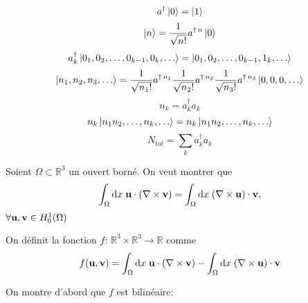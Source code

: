 \documentclass[letterpaper,12pt,oneside,final]{book}
\begin{document}
\[ a^{\dagger} \ket{0} = \ket{1}\]
\[ \ket{n} = \frac{1}{\sqrt{n!}} a^{\dagger\,n} \ket{0} \]
\[ a^{\dagger}_{k} \ket{0_{1},0_{2},\ldots,0_{k-1},0_{k},\ldots} =\ket{0_{1},0_{2},\ldots,0_{k-1},1_{k},\ldots}\]
\[ \ket{n_{1},n_{2},n_{3},\ldots} = \frac{1}{\sqrt{n_{1}!}} a^{\dagger\,n_{1}}\frac{1}{\sqrt{n_{2}!}} a^{\dagger\,n_{2}}\frac{1}{\sqrt{n_{3}!}} a^{\dagger\,n_{3}} \ket{0,0,0,\ldots}\]
\[n_{k} = a_{k}^{\dagger}a_{k} \]
\[ n_{k} \ket{n_{1}n_{2},\ldots, n_{k},\ldots} = n_{k} \ket{n_{1}n_{2},\ldots, n_{k},\ldots}\]
\[ N_{tot} = \sum_{k} a_{k}^{\dagger}a_{k} \]

Soient \( \Omega \subset \mathbb{R}^{3}\) un ouvert borné. On veut montrer que 
\[ \int_{\Omega}\text{d}x\;\vb{u}\cdot (\nabla \times \vb{v}) = \int_{\Omega}\text{d}x\;(\nabla \times \vb{u}) \cdot  \vb{v} ,\]
\( \forall \vb{u},\vb{v} \in H_{0}^{1}(\Omega) \)

On définit la fonction \( f:\, \mathbb{R}^{3} \times \mathbb{R}^{3} \rightarrow  \mathbb{R} \) comme 
\[ f(\vb{u},\vb{v}) =   \int_{\Omega}\text{d}x\;\vb{u}\cdot (\nabla \times \vb{v}) - \int_{\Omega}\text{d}x\;(\nabla \times \vb{u}) \cdot  \vb{v} \]

On montre d'abord que \( f \) est bilinéaire:
\end{document}
